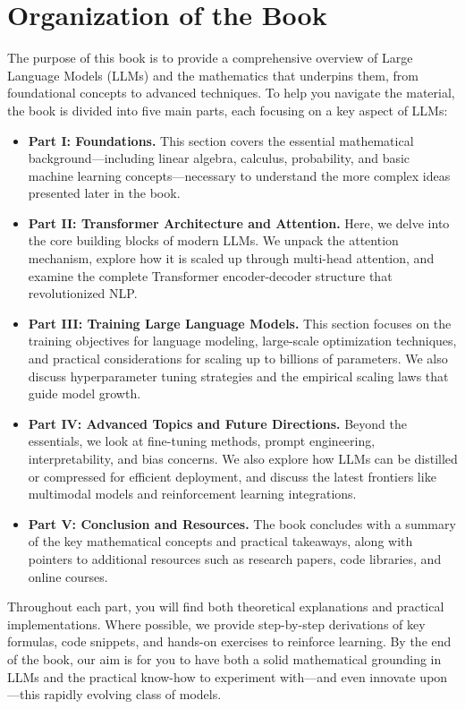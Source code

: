 \section{Organization of the Book}
\label{sec:book_organization}

\noindent
The purpose of this book is to provide a comprehensive overview of Large Language Models (LLMs) and the mathematics that underpins them, from foundational concepts to advanced techniques. To help you navigate the material, the book is divided into five main parts, each focusing on a key aspect of LLMs:

\begin{itemize}
    \item \textbf{Part I: Foundations.} 
    This section covers the essential mathematical background—including linear algebra, calculus, probability, and basic machine learning concepts—necessary to understand the more complex ideas presented later in the book.

    \item \textbf{Part II: Transformer Architecture and Attention.} 
    Here, we delve into the core building blocks of modern LLMs. We unpack the attention mechanism, explore how it is scaled up through multi-head attention, and examine the complete Transformer encoder-decoder structure that revolutionized NLP.

    \item \textbf{Part III: Training Large Language Models.}
    This section focuses on the training objectives for language modeling, large-scale optimization techniques, and practical considerations for scaling up to billions of parameters. We also discuss hyperparameter tuning strategies and the empirical scaling laws that guide model growth.

    \item \textbf{Part IV: Advanced Topics and Future Directions.}
    Beyond the essentials, we look at fine-tuning methods, prompt engineering, interpretability, and bias concerns. We also explore how LLMs can be distilled or compressed for efficient deployment, and discuss the latest frontiers like multimodal models and reinforcement learning integrations.

    \item \textbf{Part V: Conclusion and Resources.}
    The book concludes with a summary of the key mathematical concepts and practical takeaways, along with pointers to additional resources such as research papers, code libraries, and online courses. 

\end{itemize}

\noindent
Throughout each part, you will find both theoretical explanations and practical implementations. Where possible, we provide step-by-step derivations of key formulas, code snippets, and hands-on exercises to reinforce learning. By the end of the book, our aim is for you to have both a solid mathematical grounding in LLMs and the practical know-how to experiment with—and even innovate upon—this rapidly evolving class of models.
